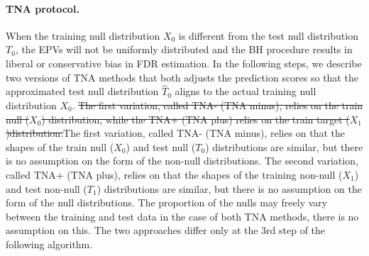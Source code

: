 \documentclass{article}
\newcommand{\correction}[2]{{\color{red}\sout{#1}}{\color{red}#2}}
\begin{document}
\paragraph{TNA protocol.} When the training null distribution $X_0$ is different from the test null distribution $T_0$, the EPVs will not be uniformly distributed and the BH procedure results in liberal or conservative bias in FDR estimation. In the following steps, we describe two versions of TNA methods that both adjusts the prediction scores so that the approximated test null distribution $\hat{T}_0$ aligns to the actual training null distribution $X_0$. \correction{The first variation, called TNA- (TNA minus), relies on the train null ($X_0$) distribution, while the TNA+ (TNA plus) relies on the train target ($X_1$)distribution.}{The first variation, called TNA- (TNA minus), relies on that the shapes of the train null ($X_0$) and test null ($T_0$) distributions are similar, but there is no assumption on the form of the non-null distributions. The second variation, called TNA+ (TNA plus), relies on that the shapes of the training non-null ($X_1$) and test non-null ($T_1$) distributions are similar, but there is no assumption on the form of the null distributions. The proportion of the nulls may freely vary between the training and test data in the case of both TNA methods, there is no assumption on this.} The two approaches differ only at the 3rd step of the following algorithm. 
\end{document}
